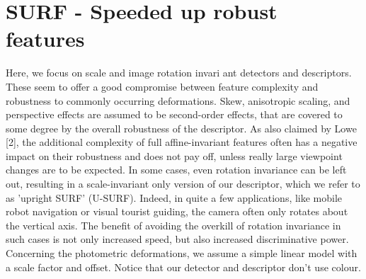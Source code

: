 \section{SURF - Speeded up robust features}
Here, we focus on scale and image rotation invari ant detectors and
descriptors. These seem to offer a good compromise between feature complexity
and robustness to commonly occurring deformations. Skew, anisotropic scaling,
and perspective effects are assumed to be second-order effects, that are
covered to some degree by the overall robustness of the descriptor. As also
claimed by Lowe [2], the additional complexity of full affine-invariant
features often has a negative impact on their robustness and does not pay off,
unless really large viewpoint changes are to be expected. In some cases, even
rotation invariance can be left out, resulting in a scale-invariant only
version of our descriptor, which we refer to as ’upright SURF’
(U-SURF). Indeed, in quite a few applications, like mobile robot navigation or
visual tourist guiding, the camera often only rotates about the vertical
axis. The benefit of avoiding the overkill of rotation invariance in such cases
is not only increased speed, but also increased discriminative
power. Concerning the photometric deformations, we assume a simple linear model
with a scale factor and offset. Notice that our detector and descriptor don’t use colour.
